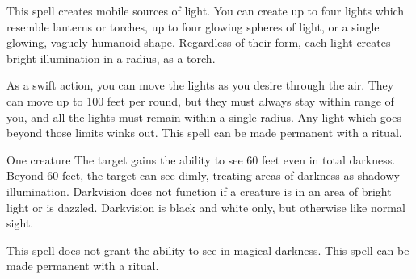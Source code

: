 \begin{comment}
\subsubsection{D}
\end{comment}

\spelldur{\durshort \dismissable}
\spellline
\spelleffect This spell creates mobile sources of light. You can create up to four lights which resemble lanterns or torches, up to four glowing spheres of light, or a single glowing, vaguely humanoid shape. Regardless of their form, each light creates bright illumination in a \areamed radius, as a torch.

As a swift action, you can move the lights as you desire through the air. They can move up to 100 feet per round, but they must always stay within range of you, and all the lights must remain within a single \areamed radius. Any light which goes beyond those limits winks out.
\spellnotes This spell can be made permanent with a  ritual.

\spellrng{\rngtouch}
\spelldur{\durlong}
\begin{spelltarget}{One creature}
    \spelleffect The target gains the ability to see 60 feet even in total darkness. Beyond 60 feet, the target can see dimly, treating areas of darkness as shadowy illumination. Darkvision does not function if a creature is in an area of bright light or is dazzled. Darkvision is black and white only, but otherwise like normal sight.
\end{spelltarget}
\spellnotes This spell does not grant the ability to see in magical darkness. This spell can be made permanent with a  ritual.

